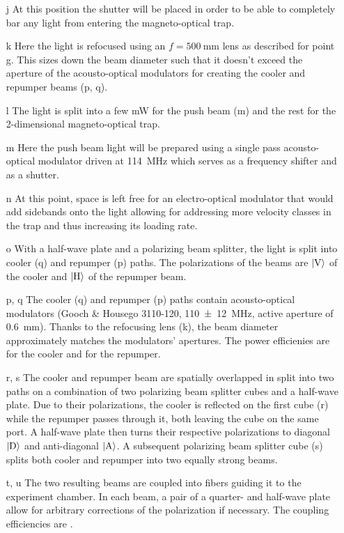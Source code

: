 \begin{itemize}
    \item[j] At this position the shutter will be placed in order to be able to completely bar any light from entering the magneto-optical trap.
    
    \item[k] Here the light is refocused using an $f = \SI{500}{\milli\meter}$ lens as described for point g. This sizes down the beam diameter such that it doesn't exceed the aperture of the acousto-optical modulators for creating the cooler and repumper beams (p, q).
    
    \item[l] The light is split into a few \si{\milli\watt} for the push beam (m) and the rest for the 2-dimensional magneto-optical trap.

    \item[m] Here the push beam light will be prepared using a single pass acousto-optical modulator driven at \SI{+114}{\mega\hertz} which serves as a frequency shifter and as a shutter.
    
    \item[n] At this point, space is left free for an electro-optical modulator that would add sidebands onto the light allowing for addressing more velocity classes in the trap and thus increasing its loading rate.
    
    \item[o] With a half-wave plate and a polarizing beam splitter, the light is split into cooler (q) and repumper (p) paths. The polarizations of the beams are $\Ket{\text{V}}$ of the cooler and $\Ket{\text{H}}$ of the repumper beam.
    
    \item[p, q] The cooler (q) and repumper  (p) paths contain acousto-optical modulators (Gooch \& Housego 3110-120, \SI{110(12)}{\mega\hertz}, active aperture of \SI{0.6}{\milli\meter}). Thanks to the refocusing lens (k), the beam diameter approximately matches the modulators' apertures. The power efficienies are  for the cooler and for the repumper.
    
    \item[r, s] The cooler and repumper beam are spatially overlapped in split into two paths on a combination of two polarizing beam splitter cubes and a half-wave plate. Due to their polarizations, the cooler is reflected on the first cube (r) while the repumper passes through it, both leaving the cube on the same port. A half-wave plate then turns their respective polarizations to diagonal $\Ket{\text{D}}$ and anti-diagonal $\Ket{\text{A}}$. A subsequent polarizing beam splitter cube (s) splits both cooler and repumper into two equally strong beams.
    
    \item[t, u] The two resulting beams are coupled into fibers guiding it to the experiment chamber. In each beam, a pair of a quarter- and half-wave plate allow for arbitrary corrections of the polarization if necessary. The coupling efficiencies are .
\end{itemize}

